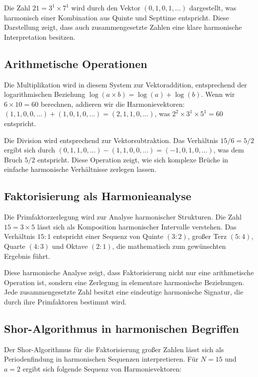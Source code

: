 \documentclass[12pt,a4paper]{report}
\begin{document}
	Die Zahl $21 = 3^1 \times 7^1$ wird durch den Vektor $(0, 1, 0, 1, \ldots)$ dargestellt, was harmonisch einer Kombination aus Quinte und Septtime entspricht. Diese Darstellung zeigt, dass auch zusammengesetzte Zahlen eine klare harmonische Interpretation besitzen.
	
	\subsection{Arithmetische Operationen}
	
	Die Multiplikation wird in diesem System zur Vektoraddition, entsprechend der logarithmischen Beziehung $\log(a \times b) = \log(a) + \log(b)$. Wenn wir $6 \times 10 = 60$ berechnen, addieren wir die Harmonievektoren: $(1, 1, 0, 0, \ldots) + (1, 0, 1, 0, \ldots) = (2, 1, 1, 0, \ldots)$, was $2^2 \times 3^1 \times 5^1 = 60$ entspricht.
	
	Die Division wird entsprechend zur Vektorsubtraktion. Das Verh{\"a}ltnis $15/6 = 5/2$ ergibt sich durch $(0, 1, 1, 0, \ldots) - (1, 1, 0, 0, \ldots) = (-1, 0, 1, 0, \ldots)$, was dem Bruch $5/2$ entspricht. Diese Operation zeigt, wie sich komplexe Br{\"u}che in einfache harmonische Verh{\"a}ltnisse zerlegen lassen.
	
	\subsection{Faktorisierung als Harmonieanalyse}
	
	Die Primfaktorzerlegung wird zur Analyse harmonischer Strukturen. Die Zahl $15 = 3 \times 5$ l{\"a}sst sich als Komposition harmonischer Intervalle verstehen. Das Verh{\"a}ltnis $15:1$ entspricht einer Sequenz von Quinte $(3:2)$, gro{\ss}er Terz $(5:4)$, Quarte $(4:3)$ und Oktave $(2:1)$, die mathematisch zum gew{\"u}nschten Ergebnis f{\"u}hrt.
	
	Diese harmonische Analyse zeigt, dass Faktorisierung nicht nur eine arithmetische Operation ist, sondern eine Zerlegung in elementare harmonische Beziehungen. Jede zusammengesetzte Zahl besitzt eine eindeutige harmonische Signatur, die durch ihre Primfaktoren bestimmt wird.
	
	\subsection{Shor-Algorithmus in harmonischen Begriffen}
	
	Der Shor-Algorithmus f{\"u}r die Faktorisierung gro{\ss}er Zahlen l{\"a}sst sich als Periodenfindung in harmonischen Sequenzen interpretieren. F{\"u}r $N = 15$ und $a = 2$ ergibt sich folgende Sequenz von Harmonievektoren:
	
\end{document}
